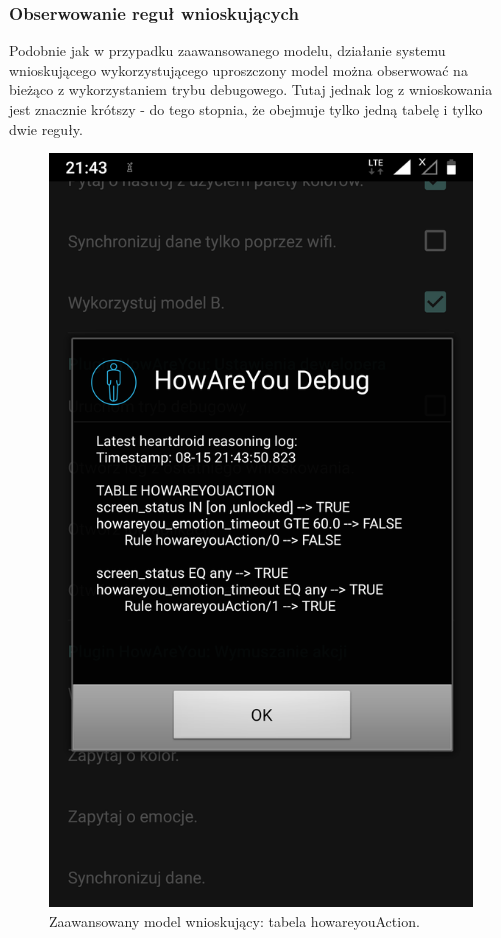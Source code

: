 \subsubsection{Obserwowanie reguł wnioskujących}

Podobnie jak w przypadku zaawansowanego modelu, działanie systemu wnioskującego wykorzystującego uproszczony model można obserwować na bieżąco z wykorzystaniem trybu debugowego. Tutaj jednak log z wnioskowania jest znacznie krótszy - do tego stopnia, że obejmuje tylko jedną tabelę i tylko dwie reguły.

\begin{figure}[H]
	\centering
	\includegraphics[scale=0.15]{rozdzial4/HMR_screenshots_B.png}
	\caption{Zaawansowany model wnioskujący: tabela howareyouAction.}
\end{figure}